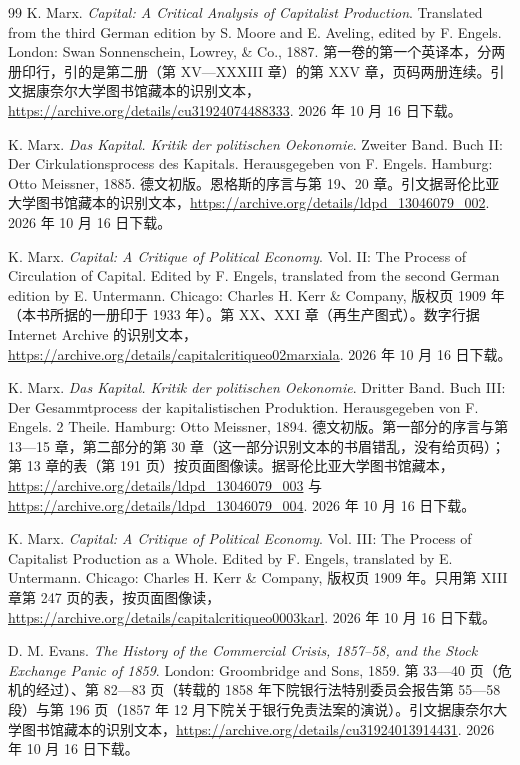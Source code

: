 \begin{thebibliography}{99}
 K. Marx. \emph{Capital: A Critical Analysis of Capitalist Production}. Translated from the third German edition by S. Moore and E. Aveling, edited by F. Engels. London: Swan Sonnenschein, Lowrey, \& Co., 1887. 第一卷的第一个英译本，分两册印行，引的是第二册（第 XV—XXXIII 章）的第 XXV 章，页码两册连续。引文据康奈尔大学图书馆藏本的识别文本，\url{https://archive.org/details/cu31924074488333}. 2026 年 10 月 16 日下载。

 K. Marx. \emph{Das Kapital. Kritik der politischen Oekonomie}. Zweiter Band. Buch II: Der Cirkulationsprocess des Kapitals. Herausgegeben von F. Engels. Hamburg: Otto Meissner, 1885. 德文初版。恩格斯的序言与第 19、20 章。引文据哥伦比亚大学图书馆藏本的识别文本，\url{https://archive.org/details/ldpd_13046079_002}. 2026 年 10 月 16 日下载。

 K. Marx. \emph{Capital: A Critique of Political Economy}. Vol. II: The Process of Circulation of Capital. Edited by F. Engels, translated from the second German edition by E. Untermann. Chicago: Charles H. Kerr \& Company, 版权页 1909 年（本书所据的一册印于 1933 年）。第 XX、XXI 章（再生产图式）。数字行据 Internet Archive 的识别文本，\url{https://archive.org/details/capitalcritiqueo02marxiala}. 2026 年 10 月 16 日下载。

 K. Marx. \emph{Das Kapital. Kritik der politischen Oekonomie}. Dritter Band. Buch III: Der Gesammtprocess der kapitalistischen Produktion. Herausgegeben von F. Engels. 2 Theile. Hamburg: Otto Meissner, 1894. 德文初版。第一部分的序言与第 13—15 章，第二部分的第 30 章（这一部分识别文本的书眉错乱，没有给页码）；第 13 章的表（第 191 页）按页面图像读。据哥伦比亚大学图书馆藏本，\url{https://archive.org/details/ldpd_13046079_003} 与 \url{https://archive.org/details/ldpd_13046079_004}. 2026 年 10 月 16 日下载。

 K. Marx. \emph{Capital: A Critique of Political Economy}. Vol. III: The Process of Capitalist Production as a Whole. Edited by F. Engels, translated by E. Untermann. Chicago: Charles H. Kerr \& Company, 版权页 1909 年。只用第 XIII 章第 247 页的表，按页面图像读，\url{https://archive.org/details/capitalcritiqueo0003karl}. 2026 年 10 月 16 日下载。

 D. M. Evans. \emph{The History of the Commercial Crisis, 1857--58, and the Stock Exchange Panic of 1859}. London: Groombridge and Sons, 1859. 第 33—40 页（危机的经过）、第 82—83 页（转载的 1858 年下院银行法特别委员会报告第 55—58 段）与第 196 页（1857 年 12 月下院关于银行免责法案的演说）。引文据康奈尔大学图书馆藏本的识别文本，\url{https://archive.org/details/cu31924013914431}. 2026 年 10 月 16 日下载。


\end{thebibliography}
